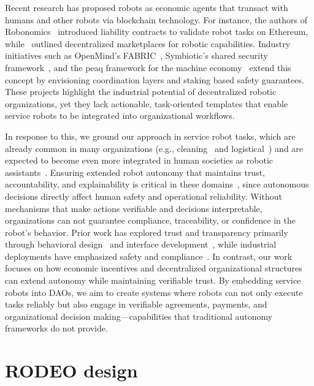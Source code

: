 \documentclass[letterpaper, 10 pt, conference]{ieeeconf}  %
\begin{document}
Recent research has proposed robots as economic agents that transact with humans and other robots via blockchain technology. For instance, the authors of Robonomics~\cite{danilov2018robonomics} introduced liability contracts to validate robot tasks on Ethereum, while~\cite{kapitonov2021raas} outlined decentralized marketplaces for robotic capabilities. Industry initiatives such as OpenMind’s FABRIC~\cite{openmind2023fabric}, Symbiotic’s shared security framework~\cite{symbiotic2024sharedsecurity}, and the peaq framework for the machine economy~\cite{peaq_machine_economy} extend this concept by envisioning coordination layers and staking based safety guarantees. These projects highlight the industrial potential of decentralized robotic organizations, yet they lack actionable, task-oriented templates that enable service robots to be integrated into organizational workflows.

In response to this, we ground our approach in service robot tasks, which are already common in many organizations (e.g., cleaning~\cite{vanderloos2020service} and logistical~\cite{prassler2010cleaning}) and are expected to become even more integrated in human societies as robotic assistants~\cite{nvidiaPhysicalAI, gemini_robotics_2025}. Ensuring extended robot autonomy that maintains trust, accountability, and explainability is critical in these domains~\cite{srinivas2021survey}, since autonomous decisions directly affect human safety and operational reliability. Without mechanisms that make actions verifiable and decisions interpretable, organizations can not guarantee compliance, traceability, or confidence in the robot’s behavior. Prior work has explored trust and transparency primarily through behavioral design~\cite{fernandes2019robotchain} and interface development~\cite{zhang2022rosethereum}, while industrial deployments have emphasized safety and compliance~\cite{kallweit2015ros}. In contrast, our work focuses on how economic incentives and decentralized organizational structures can extend autonomy while maintaining verifiable trust. By embedding service robots into DAOs, we aim to create systems where robots can not only execute tasks reliably but also engage in verifiable agreements, payments, and organizational decision making---capabilities that traditional autonomy frameworks do not provide. 

\vspace{-15pt}
\section{RODEO design}
\end{document}
